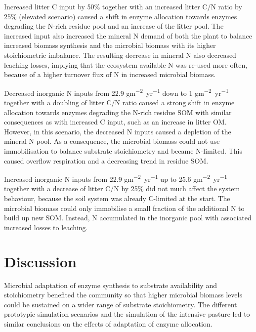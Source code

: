 Increased litter C input by 50\% together with an increased litter C/N
ratio by 25\% (elevated  scenario) caused a shift in enzyme
allocation towards enzymes degrading the N-rich residue pool and an increase of
the litter pool. The increased input also increased the mineral N demand of both the plant
to balance increased biomass synthesis and the microbial biomass with its higher
stoichiometric imbalance. The resulting decrease in mineral N also decreased
leaching losses, implying that the ecosystem available N was re-used more often, because of a higher
turnover flux of N in increased microbial biomass.

Decreased inorganic N inputs from 22.9
\unit{gm^{-2}yr^{-1}} down to 1
\unit{gm^{-2}yr^{-1}} together with a doubling of litter C/N
ratio caused a strong shift in enzyme allocation towards enzymes degrading the
N-rich residue SOM with similar consequences as with increased C input,
such as an increase in litter OM. However, in this scenario, the decreased N inputs caused
a depletion of the mineral N pool.
As a consequence, the microbial biomass could not use immobilisation to
balance substrate stoichiometry and became N-limited.
This caused overflow respiration and a decreasing trend in residue SOM.

Increased inorganic N inputs from 22.9 \unit{gm^{-2}yr^{-1}} up to 25.6
\unit{gm^{-2}yr^{-1}} together with a decrease of litter C/N by 25\% did not
much affect the system behaviour, because the soil system was already C-limited
at the start. The microbial biomass could only immobilise a small fraction of the additional N to build 
up new SOM. Instead, N accumulated in the inorganic pool with associated
increased losses to leaching.

\section{Discussion}
Microbial adaptation of enzyme synthesis to substrate availability and
stoichiometry benefited the community so that higher microbial biomass levels
could be sustained on a wider range of substrate stoichiometry.
The different prototypic simulation scenarios and the simulation of the
intensive pasture led to similar conclusions on the effects of adaptation of
enzyme allocation.

